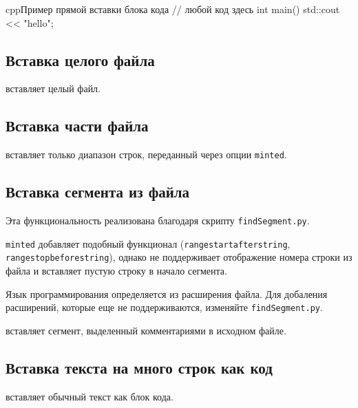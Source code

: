 \documentclass[a4paper,12pt]{report}
\begin{document}
\begin{code}{cpp}{Пример прямой вставки блока кода}
// любой код здесь
int main()
{
    std::cout << "hello";
}
\end{code}

\subsection{Вставка целого файла}

 вставляет целый файл.


\subsection{Вставка части файла}

 вставляет только диапазон строк, переданный через опции \verb|minted|.


\subsection{Вставка сегмента из файла}

Эта функциональность реализована благодаря скрипту \texttt{findSegment.py}.

\verb|minted| добавляет подобный функционал (\verb|rangestartafterstring|, \verb|rangestopbeforestring|),
однако не поддерживает отображение номера строки из файла и вставляет пустую строку в начало сегмента.

Язык программирования определяется из расширения файла. 
Для добаления расширений, которые еще не поддерживаются, изменяйте \texttt{findSegment.py}.

 вставляет сегмент, выделенный комментариями в исходном файле.


\subsection{Вставка текста на много строк как код}

 вставляет обычный текст как блок кода.
\end{document}

